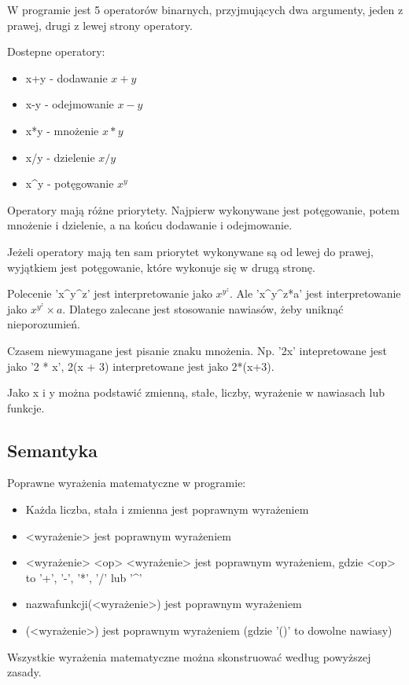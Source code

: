 \documentclass[a4paper]{article}
\begin{document}
W programie jest 5 operatorów binarnych, przyjmujących dwa argumenty, jeden z prawej, drugi z lewej strony operatory. 

Dostepne operatory:
\begin{itemize}
    \item x+y - dodawanie $x+y$
    \item x-y - odejmowanie $x-y$
    \item x*y - mnożenie $x*y$
    \item x/y - dzielenie $x/y$
    \item x\^{}y - potęgowanie $x^y$ 
\end{itemize}

Operatory mają różne priorytety. Najpierw wykonywane jest potęgowanie, potem mnożenie i dzielenie, a na końcu dodawanie i odejmowanie.

Jeżeli operatory mają ten sam priorytet wykonywane są od lewej do prawej, wyjątkiem jest potęgowanie, które wykonuje się w drugą stronę.

Polecenie 'x\^{}y\^{}z' jest interpretowanie jako $x^{y^z}$. 
Ale 'x\^{}y\^{}z*a' jest interpretowanie jako $x^{y^z} \times a$. Dlatego zalecane jest stosowanie nawiasów, żeby uniknąć nieporozumień.

Czasem niewymagane jest pisanie znaku mnożenia. Np. '2x' intepretowane jest jako '2 * x', 2(x + 3) interpretowane jest jako 2*(x+3).

Jako x i y można podstawić zmienną, stałe, liczby, wyrażenie w nawiasach lub funkcje.

\subsection{Semantyka}

Poprawne wyrażenia matematyczne w programie:
\begin{itemize}
    \item Każda liczba, stała i zmienna jest poprawnym wyrażeniem
    \item <wyrażenie> jest poprawnym wyrażeniem
    \item <wyrażenie> <op> <wyrażenie> jest poprawnym wyrażeniem, gdzie <op> to '+', '-', '*', '/' lub '\^{}'
    \item nazwafunkcji(<wyrażenie>) jest poprawnym wyrażeniem
    \item (<wyrażenie>) jest poprawnym wyrażeniem (gdzie '()' to dowolne nawiasy)
\end{itemize}

Wszystkie wyrażenia matematyczne można skonstruować według powyższej zasady.
\end{document}
